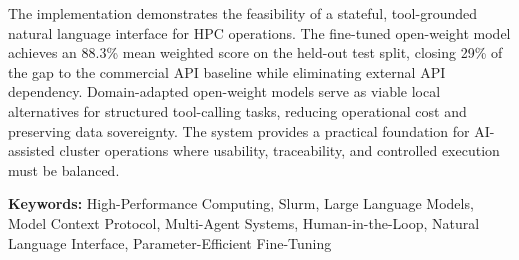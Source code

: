 The implementation demonstrates the feasibility of a stateful, tool-grounded natural language interface for HPC operations. The fine-tuned open-weight model achieves an 88.3\% mean weighted score on the held-out test split, closing 29\% of the gap to the commercial API baseline while eliminating external API dependency. Domain-adapted open-weight models serve as viable local alternatives for structured tool-calling tasks, reducing operational cost and preserving data sovereignty. The system provides a practical foundation for AI-assisted cluster operations where usability, traceability, and controlled execution must be balanced.

\textbf{Keywords:} High-Performance Computing, Slurm, Large Language Models, Model Context Protocol, Multi-Agent Systems, Human-in-the-Loop, Natural Language Interface, Parameter-Efficient Fine-Tuning
